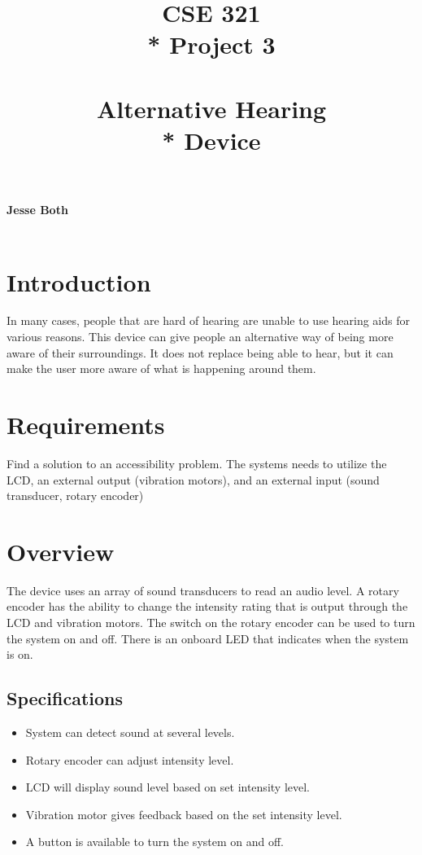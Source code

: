 \documentclass{article}
\title{\Huge{\textbf{CSE 321}  \\* Project 3 \\~\\ \textbf{Alternative Hearing \\* Device}}}
\date{} %
\begin{document}
    \setcounter{secnumdepth}{-1}
    \maketitle
    \vfill 
    {\Large\centering\textbf{Jesse Both  \\~\\}\par}

    {\Large{}\par}
    {\large\centering{\today}\par}

    \newpage
    \begin{center}
        \tableofcontents
    \end{center}
\newpage


\section{Introduction}
In many cases, people that are hard of hearing are unable to use hearing aids for various reasons.  This device can give people an alternative way of being more aware of their surroundings.  It does not replace being able to hear, but it can make the user more aware of what is happening around them.

\section{Requirements}
Find a solution to an accessibility problem.  The systems needs to utilize the LCD, an external output (vibration motors), and an external input (sound transducer, rotary encoder)

\section{Overview}
The device uses an array of sound transducers to read an audio level.  A rotary encoder has the ability to change the intensity rating that is output through the LCD and vibration motors.  The switch on the rotary encoder can be used to turn the system on and off.  There is an onboard LED that indicates when the system is on.
\subsection{Specifications}
\begin{itemize}
    \item System can detect sound at several levels.
    \item Rotary encoder can adjust intensity level.    
    \item LCD will display sound level based on set intensity level.
    \item Vibration motor gives feedback based on the set intensity level.
    \item A button is available to turn the system on and off.
\end{itemize}
\end{document}
